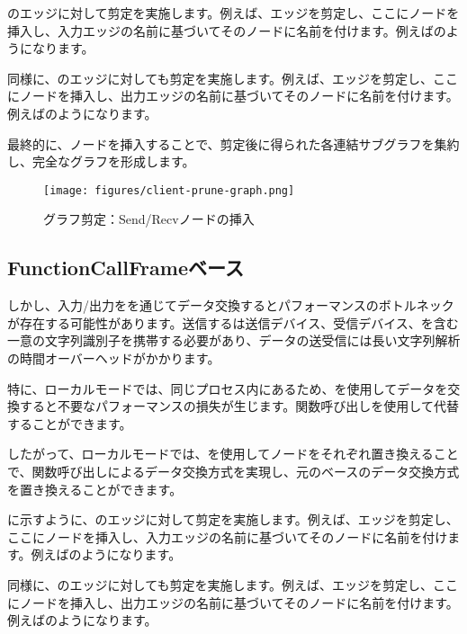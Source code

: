 \begin{content}
のエッジに対して剪定を実施します。例えば、エッジを剪定し、ここにノードを挿入し、入力エッジの名前に基づいてそのノードに名前を付けます。例えばのようになります。

同様に、のエッジに対しても剪定を実施します。例えば、エッジを剪定し、ここにノードを挿入し、出力エッジの名前に基づいてそのノードに名前を付けます。例えばのようになります。

最終的に、ノードを挿入することで、剪定後に得られた各連結サブグラフを集約し、完全なグラフを形成します。

\begin{figure}[H]
\centering
\texttt{[image: figures/client-prune-graph.png]}
\caption{グラフ剪定：Send/Recvノードの挿入}
 \label{fig:client-prune-graph}
\end{figure}

\subsection{FunctionCallFrameベース}

しかし、入力/出力をを通じてデータ交換するとパフォーマンスのボトルネックが存在する可能性があります。送信するは送信デバイス、受信デバイス、を含む一意の文字列識別子を携帯する必要があり、データの送受信には長い文字列解析の時間オーバーヘッドがかかります。

特に、ローカルモードでは、同じプロセス内にあるため、を使用してデータを交換すると不要なパフォーマンスの損失が生じます。関数呼び出しを使用して代替することができます。

したがって、ローカルモードでは、を使用してノードをそれぞれ置き換えることで、関数呼び出しによるデータ交換方式を実現し、元のベースのデータ交換方式を置き換えることができます。

に示すように、のエッジに対して剪定を実施します。例えば、エッジを剪定し、ここにノードを挿入し、入力エッジの名前に基づいてそのノードに名前を付けます。例えばのようになります。

同様に、のエッジに対しても剪定を実施します。例えば、エッジを剪定し、ここにノードを挿入し、出力エッジの名前に基づいてそのノードに名前を付けます。例えばのようになります。


\end{content}
